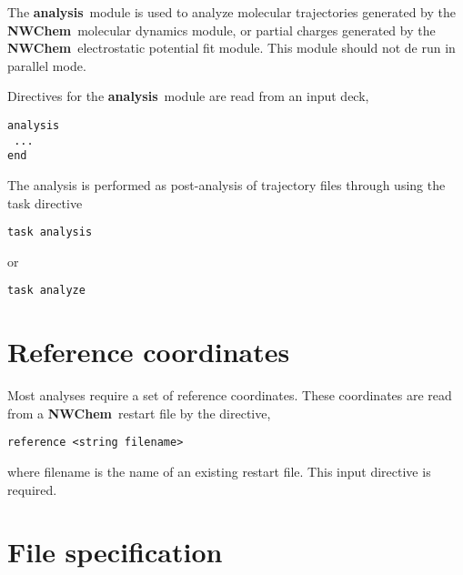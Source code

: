 \label{sec:analysis}
\def\bmu{\mbox{\boldmath $\mu$}}
\def\bE{\mbox{\bf E}}
\def\br{\mbox{\bf r}}
\def\tT{\tilde{T}}
\def\t{\tilde{1}}
\def\ip{i\prime}
\def\jp{j\prime}
\def\ipp{i\prime\prime}
\def\jpp{j\prime\prime}
\def\etal{{\sl et al.}}
\def\nwchem{{\bf NWChem}}
\def\nwargos{{\bf nwargos}}
\def\nwtop{{\bf nwtop}}
\def\nwrst{{\bf nwrst}}
\def\nwsgm{{\bf nwsgm}}
\def\esp{{\bf esp}}
\def\md{{\bf md}}
\def\prepare{{\bf prepare}}
\def\analysis{{\bf analysis}}
\def\argos{{\bf ARGOS}}
\def\amber{{\bf AMBER}}
\def\charmm{{\bf CHARMM}}
\def\discover{{\bf DISCOVER}}
\def\povray{{\bf povray}}
\def\gopenmol{{\bf gOpenMol}}
\def\ecce{{\bf ecce}}

The \analysis\ module is used to analyze molecular trajectories generated
by the \nwchem\ molecular dynamics module, or partial charges generated
by the \nwchem\ electrostatic potential fit module. This module should
not de run in parallel mode.

Directives for the \analysis\ module are read from an input deck,

\begin{verbatim}
analysis
 ...
end
\end{verbatim}

The analysis is performed  as post-analysis of trajectory files through 
using the {\rm task} directive

\begin{verbatim}
task analysis
\end{verbatim}
or
\begin{verbatim}
task analyze
\end{verbatim}

\section{Reference coordinates}

Most analyses require a set of reference coordinates. These
coordinates are read from a \nwchem\ restart file by the directive,

\begin{verbatim}
reference <string filename>
\end{verbatim}

where {\rm filename} is the name of an existing restart file. 
This input directive is required.

\section{File specification}

